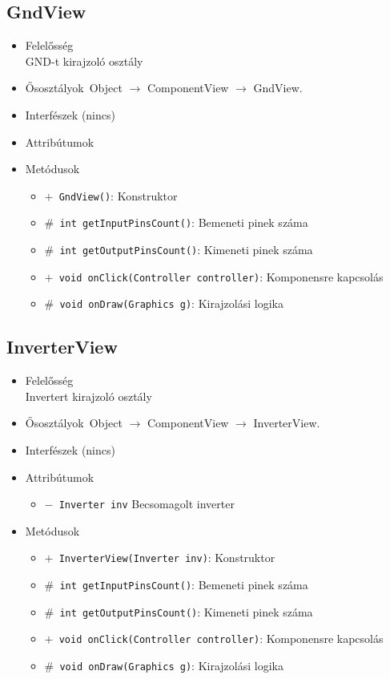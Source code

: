 \subsection{GndView}
\begin{itemize}
\item Felelősség\\
GND-t kirajzoló osztály
\item Ősosztályok\ Object $\rightarrow{}$ ComponentView $\rightarrow{}$ GndView.
\item Interfészek (nincs)
\item Attribútumok $\ $
\item Metódusok$\ $
\begin{itemize}
	\item[] \texttt{$+$ GndView()}: Konstruktor
	\item[] \texttt{$\#$ int getInputPinsCount()}: Bemeneti pinek száma
	\item[] \texttt{$\#$ int getOutputPinsCount()}: Kimeneti pinek száma
	\item[] \texttt{$+$ void onClick(Controller controller)}: Komponensre kapcsolás
	\item[] \texttt{$\#$ void onDraw(Graphics g)}: Kirajzolási logika
\end{itemize}
\end{itemize}

\subsection{InverterView}
\begin{itemize}
\item Felelősség\\
Invertert kirajzoló osztály
\item Ősosztályok\ Object $\rightarrow{}$ ComponentView $\rightarrow{}$ InverterView.
\item Interfészek (nincs)
\item Attribútumok $\ $
\begin{itemize}
	\item[] \texttt{$-$ Inverter inv} Becsomagolt inverter
\end{itemize}
\item Metódusok$\ $
\begin{itemize}
	\item[] \texttt{$+$ InverterView(Inverter inv)}: Konstruktor
	\item[] \texttt{$\#$ int getInputPinsCount()}: Bemeneti pinek száma
	\item[] \texttt{$\#$ int getOutputPinsCount()}: Kimeneti pinek száma
	\item[] \texttt{$+$ void onClick(Controller controller)}: Komponensre kapcsolás
	\item[] \texttt{$\#$ void onDraw(Graphics g)}: Kirajzolási logika
\end{itemize}
\end{itemize}

